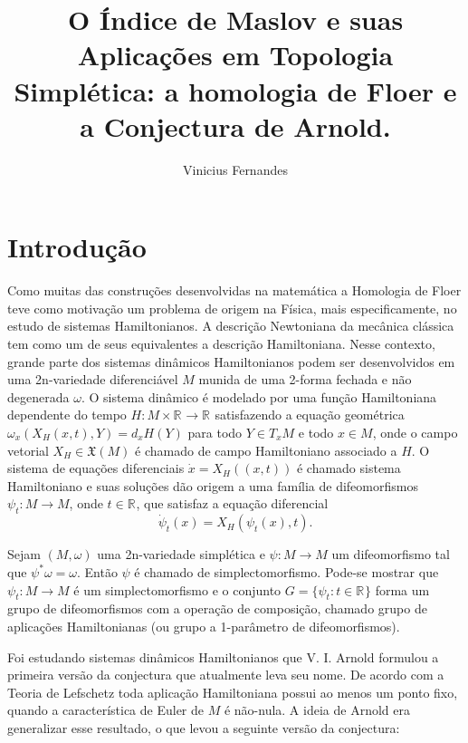 \documentclass[12pt]{book}
\newcommand{\campohamiltoniano}[1]{X_{H}(#1)}
\newcommand{\campohamiltonianoabrev}{X_{H}}
\newcommand{\campossuaves}[1]{\mathfrak{X}(#1)}
\newcommand{\espacotangenteponto}[2]{T_{#1}#2}
\newcommand{\real}[1]{\mathbb{R}^{#1}}
\newcommand{\reta}{\real{}}
\begin{document}
	
	\title{O Índice de Maslov e suas Aplicações em Topologia Simplética: a homologia de Floer e a Conjectura de Arnold.}
	
	\author{Vinicius Fernandes}
	
	\maketitle
	
	\tableofcontents
	
	\chapter*{Introdução}\label{capitulo_introducao}
	Como muitas das construções desenvolvidas na matemática a Homologia de Floer teve como motivação um problema de origem na Física, mais especificamente, no estudo de sistemas Hamiltonianos. A descrição Newtoniana da mecânica clássica tem como um de seus equivalentes a descrição Hamiltoniana. Nesse contexto, grande parte dos sistemas dinâmicos Hamiltonianos podem ser desenvolvidos em uma 2n-variedade diferenciável $M$ munida de uma 2-forma fechada e não degenerada $\omega$. O sistema dinâmico é modelado por uma função Hamiltoniana dependente do tempo $H: M\times \reta\to \reta$ satisfazendo a equação geométrica $\omega_{x}(\campohamiltonianoabrev(x,t), Y) = d_{x}H(Y)$ para todo $Y \in \espacotangenteponto{x}{M}$ e todo $x \in M$, onde o campo vetorial $\campohamiltonianoabrev \in \campossuaves{M}$ é chamado de campo Hamiltoniano associado a $H$. O sistema de equações diferenciais $\dot{x} = \campohamiltoniano{(x,t)}$ é chamado sistema Hamiltoniano e suas soluções dão origem a uma família de difeomorfismos $\psi_{t}:M\to M$, onde $t\in \reta$, que satisfaz a equação diferencial
	$$
	\dot{\psi}_{t}(x) = \campohamiltoniano{\psi_{t}(x),t}.
	$$
	
	Sejam $(M, \omega )$ uma 2n-variedade simplética e $\psi:M \to M$ um difeomorfismo tal que $\psi^{*}\omega = \omega$. Então $\psi$ é chamado de simplectomorfismo. Pode-se mostrar que $\psi_{t}:M\to M$ é um simplectomorfismo e o conjunto $G=\{\psi_{t}: t \in \reta\}$ forma um grupo de difeomorfismos com a operação de composição, chamado grupo de aplicações Hamiltonianas (ou grupo a 1-parâmetro de difeomorfismos).
	
	Foi estudando sistemas dinâmicos Hamiltonianos que V. I. Arnold formulou a primeira versão da conjectura que atualmente leva seu nome. De acordo com a Teoria de Lefschetz toda aplicação Hamiltoniana possui ao menos um ponto fixo, quando a característica de Euler de $M$ é não-nula. A ideia de Arnold era generalizar esse resultado, o que levou a seguinte versão da conjectura:
	
\end{document}
